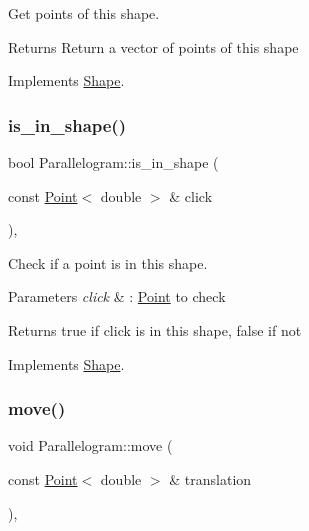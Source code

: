 Get points of this shape. 

\begin{DoxyReturn}{Returns}
Return a vector of points of this shape 
\end{DoxyReturn}


Implements \hyperlink{classShape_add74a5c682840fa4a519242b1ddbd0b5}{Shape}.

\mbox{\label{classParallelogram_a585b14ca0f65ed3a5007e8c1df3c6bc4}} 
\subsubsection{\texorpdfstring{is\+\_\+in\+\_\+shape()}{is\_in\_shape()}}
{\footnotesize\ttfamily bool Parallelogram\+::is\+\_\+in\+\_\+shape (\begin{DoxyParamCaption}\item[{const \hyperlink{classPoint}{Point}$<$ double $>$ \&}]{click }\end{DoxyParamCaption})\hspace{0.3cm}{\ttfamily [override]}, {\ttfamily [virtual]}}



Check if a point is in this shape. 


\begin{DoxyParams}{Parameters}
{\em click} & \+: \hyperlink{classPoint}{Point} to check \\
\hline
\end{DoxyParams}
\begin{DoxyReturn}{Returns}
true if click is in this shape, false if not 
\end{DoxyReturn}


Implements \hyperlink{classShape_aa09a621da090e42840b4bec7ffb27620}{Shape}.

\mbox{\label{classParallelogram_ae8d51f9b629160df31c8a12c28da279e}} 
\subsubsection{\texorpdfstring{move()}{move()}}
{\footnotesize\ttfamily void Parallelogram\+::move (\begin{DoxyParamCaption}\item[{const \hyperlink{classPoint}{Point}$<$ double $>$ \&}]{translation }\end{DoxyParamCaption})\hspace{0.3cm}{\ttfamily [override]}, {\ttfamily [virtual]}}



